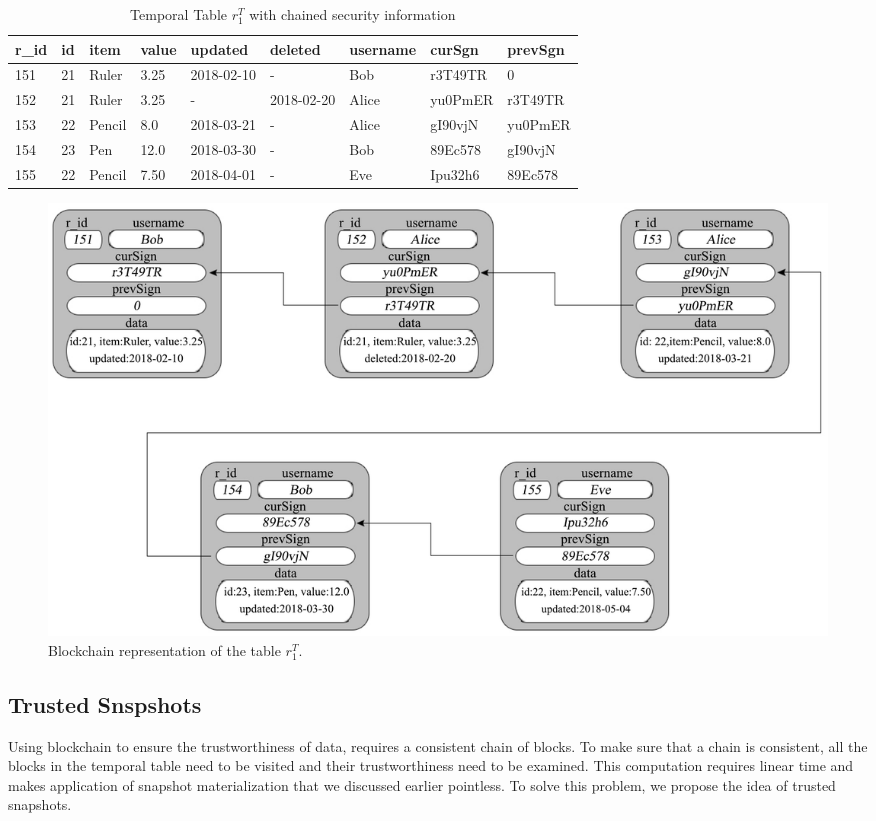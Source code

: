 			\begin{center}
			\begin{table}
				\centering
				\footnotesize
				\caption{Temporal Table $r_1^T$ with chained security information}
				\label{temporal_blockchain_table}
				\begin{tabular}{p{0.5cm}p{0.5cm}p{1cm}p{0.5cm}p{1.7cm}p{1.7cm}p{1.5cm}p{1.5cm}p{1.5cm}}
					\hline
					r\_id & id & item      & value  & updated  & deleted & username & curSgn & prevSgn \\ \hline
					151& 21 & Ruler    & 3.25  & 2018-02-10  &  - & Bob &r3T49TR & 0\\  
					152& 21 & Ruler    & 3.25  & -  &  2018-02-20 & Alice & yu0PmER & r3T49TR\\
					153& 22 & Pencil    & 8.0  & 2018-03-21  &  - & Alice & gI90vjN & yu0PmER\\
					154& 23 & Pen    & 12.0  & 2018-03-30  &  - & Bob & 89Ec578 & gI90vjN\\
					155& 22 & Pencil & 7.50  & 2018-04-01 & - & Eve & Ipu32h6 & 89Ec578\\ \hline
				\end{tabular}
			\end{table} 
			\end{center}

			\begin{figure}
				\centering
				\includegraphics[width=\textwidth]{figs/temporal_blockchain.pdf}
				\caption{Blockchain representation of the table $r_1^T$.}
				\label{fig:blockchain_representation}
			\end{figure}

		\subsection{Trusted Snspshots}
			Using blockchain to ensure the trustworthiness of data, requires a consistent chain of blocks. To make sure that a chain is consistent, all the blocks in the temporal table need to be visited and their trustworthiness need to be examined. This computation requires linear time and makes application of snapshot materialization that we discussed earlier pointless. To solve this problem, we propose the idea of trusted snapshots.

